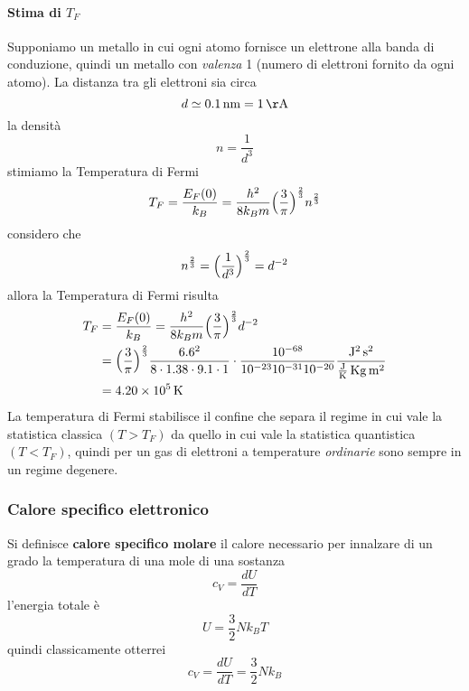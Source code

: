 \paragraph{Stima di $T_F$}
Supponiamo un metallo in cui ogni atomo fornisce un elettrone alla banda di conduzione, quindi un metallo con \textit{valenza} 1 (numero di elettroni fornito da ogni atomo).
La distanza tra gli elettroni sia circa
\begin{equation}
d \simeq \SI{0.1}{n m} = \SI{1}{\AA}
\end{equation}
la densità
\begin{equation}
n = \frac{1}{d^3}
\end{equation}
stimiamo la Temperatura di Fermi
\begin{equation}
T_F = \frac{E_F(0)}{k_B} = \frac{h^2}{8k_B m} \Bigl(  \frac{3}{\pi}  \Bigr)^{ \frac{2}{3} } n^{ \frac{2}{3} }
\end{equation}
considero che 
\begin{equation}
n^{ \frac{2}{3} } = \Bigl(  \frac{1}{d^3}  \Bigr)^{ \frac{2}{3} } = d^{ -2 }
\end{equation}
allora la Temperatura di Fermi risulta
\begin{equation}
\begin{split}
T_F & = \frac{E_F(0)}{k_B} = \frac{h^2}{8k_B m} \Bigl(  \frac{3}{\pi}  \Bigr)^{ \frac{2}{3} } d^{ -2 } \\
& = \Bigl(\frac{3}{\pi}\Bigr)^{\frac{2}{3}}\frac{6.6^2}{8 \cdot 1.38 \cdot 9.1 \cdot 1} 
\cdot \frac{10^{-68}}{10^{-23}10^{-31}10^{-20}} \frac{\SI{}{J^2.s^2}}{\SI{}{\frac{J}{K}.Kg.m^2}} \\
& = \SI{4.20e5}{K}
\end{split}
\end{equation}
La temperatura di Fermi stabilisce il confine che separa il regime in cui vale la statistica classica $(T>T_F)$ da quello in cui vale la statistica quantistica $(T<T_F)$, quindi per un gas di elettroni a temperature \textit{ordinarie} sono sempre in un regime degenere.


\subsubsection{Calore specifico elettronico}
Si definisce \textbf{calore specifico molare} il calore necessario per innalzare di un grado la temperatura di una mole di una sostanza
\begin{equation}
c_V = \frac{dU}{dT}
\end{equation}
l'energia totale è 
\begin{equation}
U = \frac{3}{2}N k_B T
\end{equation}
quindi classicamente otterrei
\begin{equation}
c_V =  \frac{dU}{dT} = \frac{3}{2} N k_B
\end{equation}

